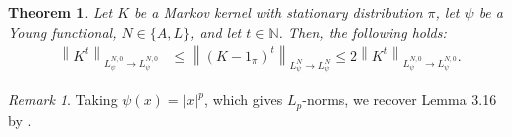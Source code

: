 \documentclass[11pt]{article}
\theoremstyle{plain}
\newtheorem{theorem}{Theorem}[section]
\theoremstyle{remark}
\newtheorem{remark}{Remark}
\begin{document}
\begin{theorem} \label{thm:contractionCoefficientsRelationship}
        Let $K$ be a Markov kernel with stationary distribution $\pi$, let $\psi$ be a Young functional, $N\in\{A,L\}$, and let $t\in\mathbb{N}$. 
        Then, the following holds:
        \begin{align}
            \left\lVert K^t \right\rVert_{L_\psi^{N,0} \to L_\psi^{N,0}} &\leq \left\lVert (K - 1_\pi)^t \right\rVert_{L_\psi^N \to L_\psi^N}  \leq 2 \left\lVert K^t \right\rVert_{L_\psi^{N,0} \to L_\psi^{N,0}}. \label{eq:contractionOrliczMean0AndNot}
            \end{align}
    \end{theorem}
    \begin{remark}
    Taking %
    $\psi(x)=|x|^p$, which gives $L_p$-norms, we recover Lemma 3.16 by %
    \cite{mcmcThesis}. 
    \end{remark}
\end{document}
